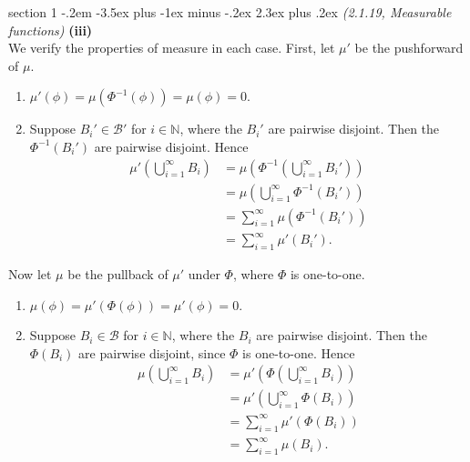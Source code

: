 \documentclass[12pt]{article}
\makeatletter
\theoremstyle{norm}
\newcommand{\N}[0]{\mathbb{N}}
\providecommand{\cal}[1]{\mathcal{#1}}
\renewcommand{\cal}[1]{\mathcal{#1}}
\newcommand{\pa}[1]{\left( {#1} \right)}
\newcommand{\subprob}[1]{\noindent\textbf{#1}\\}
\newenvironment{problem}{\@startsection
       {section}
       {1}
       {-.2em}
       {-3.5ex plus -1ex minus -.2ex}
       {2.3ex plus .2ex}
       {\pagebreak[3]%
       \large\bf\noindent{Problem }
       }
       }
       {%
       }
\makeatother
\begin{document}
\begin{problem}{\it (2.1.19, Measurable functions)}
\subprob{(iii)}
We verify the properties of measure in each case. First, let $\mu'$ be the pushforward of $\mu$.
\begin{enumerate}
\item
$\mu'(\phi)=\mu(\Phi^{-1}(\phi))=\mu(\phi)=0$.
\item
Suppose $B_i'\in \cal B'$ for $i\in \N$, where the $B_i'$ are pairwise disjoint. Then the $\Phi^{-1}(B_i')$ are pairwise disjoint. Hence
\begin{align*}
\mu'\pa{\bigcup_{i=1}^{\infty} B_i}
&=
\mu\pa{\Phi^{-1}\pa{\bigcup_{i=1}^{\infty}B_i'}}\\
&=\mu\pa{\bigcup_{i=1}^{\infty} \Phi^{-1}(B_i')}\\
&=\sum_{i=1}^{\infty} \mu(\Phi^{-1}(B_i'))\\
&=\sum_{i=1}^{\infty}\mu'(B_i').
\end{align*}
\end{enumerate}
Now let $\mu$ be the pullback of $\mu'$ under $\Phi$, where $\Phi$ is one-to-one.
\begin{enumerate}
\item
$\mu(\phi)=\mu'(\Phi(\phi))=\mu'(\phi)=0$.
\item
Suppose $B_i\in \cal B$ for $i\in \N$, where the $B_i$ are pairwise disjoint. Then the $\Phi(B_i)$ are pairwise disjoint, since $\Phi$ is one-to-one. Hence
\begin{align*}
\mu\pa{\bigcup_{i=1}^{\infty} B_i}
&=
\mu'\pa{\Phi\pa{\bigcup_{i=1}^{\infty}B_i}}\\
&=\mu'\pa{\bigcup_{i=1}^{\infty} \Phi(B_i)}\\
&=\sum_{i=1}^{\infty} \mu'(\Phi(B_i))\\
&=\sum_{i=1}^{\infty}\mu(B_i).
\end{align*}
\end{enumerate}
\end{problem}
\end{document}
